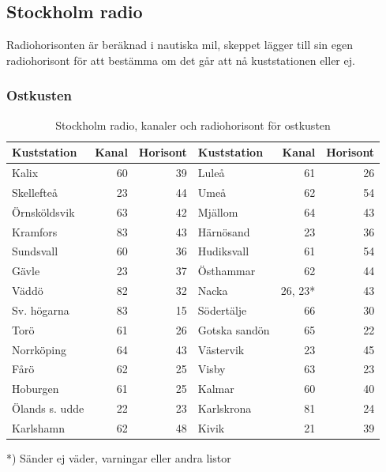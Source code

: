 {\subsection{Stockholm radio}

Radiohorisonten är beräknad i nautiska mil, skeppet lägger till sin egen
radiohorisont för att bestämma om det går att nå kuststationen eller ej.

\subsubsection{Ostkusten}

\begin{table}[H]
\centering
\begin{tabular}{lrr|lrr}
\textbf{Kuststation} & \textbf{Kanal} & \textbf{Horisont} & \textbf{Kuststation} & \textbf{Kanal}& \textbf{Horisont}\\
\hline
Kalix          & 60 & 39 & Luleå         & 61 & 26 \\
Skellefteå     & 23 & 44 & Umeå          & 62 & 54 \\
Örnsköldsvik   & 63 & 42 & Mjällom       & 64 & 43 \\
Kramfors       & 83 & 43 & Härnösand     & 23 & 36 \\
Sundsvall      & 60 & 36 & Hudiksvall    & 61 & 54 \\
Gävle          & 23 & 37 & Östhammar     & 62 & 44 \\
Väddö          & 82 & 32 & Nacka         & 26, 23* & 43 \\
Sv. högarna    & 83 & 15 & Södertälje    & 66 & 30 \\
Torö           & 61 & 26 & Gotska sandön & 65 & 22 \\
Norrköping     & 64 & 43 & Västervik     & 23 & 45 \\
Fårö           & 62 & 25 & Visby         & 63 & 23 \\
Hoburgen       & 61 & 25 & Kalmar        & 60 & 40 \\
Ölands s. udde & 22 & 23 & Karlskrona    & 81 & 24 \\
Karlshamn      & 62 & 48 & Kivik         & 21 & 39\\
\end{tabular}
\caption{Stockholm radio, kanaler och radiohorisont för ostkusten}
\end{table}

*) Sänder ej väder, varningar eller andra listor

}
